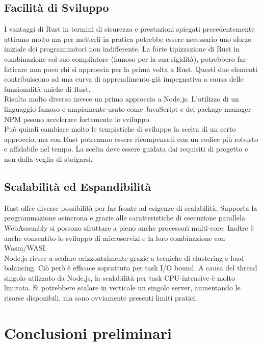 \subsection{Facilità di Sviluppo}
I vantaggi di Rust in termini di sicurezza e prestazioni spiegati precedentemente attirano molto ma per metterli in pratica potrebbe essere necessario uno sforzo iniziale dei programmatori non indifferente.
La forte tipizzazione di Rust in combinazione col suo compilatore (famoso per la sua rigidità), potrebbero far faticare non poco chi si approccia per la prima volta a Rust.
Questi due elementi contribuiscono ad una curva di apprendimento già impegnativa a causa delle funzionalità uniche di Rust.
\\Risulta molto diverso invece un primo approccio a Node.js. L'utilizzo di un linguaggio famoso e ampiamente usato come JavaScript e del package manager NPM pssono accelerare fortemente lo sviluppo.
\\Può quindi cambiare molto le tempistiche di sviluppo la scelta di un certo approccio, ma con Rust potremmo essere ricompensati con un codice più robusto e affidabile nel tempo. La scelta deve essere guidata dai requisiti di progetto e non dalla voglia di sbrigarsi.
\subsection{Scalabilità ed Espandibilità}
Rust offre diverse possibilità per far fronte ad esigenze di scalabilità. 
Supporta la programmazione asincrona e grazie alle caratteristiche di esecuzione parallela WebAssembly si possono sfruttare a pieno anche processori multi-core.
Inoltre è anche consentito lo sviluppo di microservizi e la loro combinazione con Wasm/WASI.
\\Node.js riesce a scalare orizzontalmente grazie a tecniche di clustering e load balancing.
Ciò però è efficace soprattuto per task I/O bound.
A causa del thread singolo utlizzato da Node.js, la scalabilità per task CPU-intensive è molto limitata.
Si potrebbere scalare in verticale un singolo server, aumentando le risorse disponibili, ma sono ovviamente presenti limiti pratici.
\newpage
\section{Conclusioni preliminari}
\label{sec:ConclusioniTecnologie}